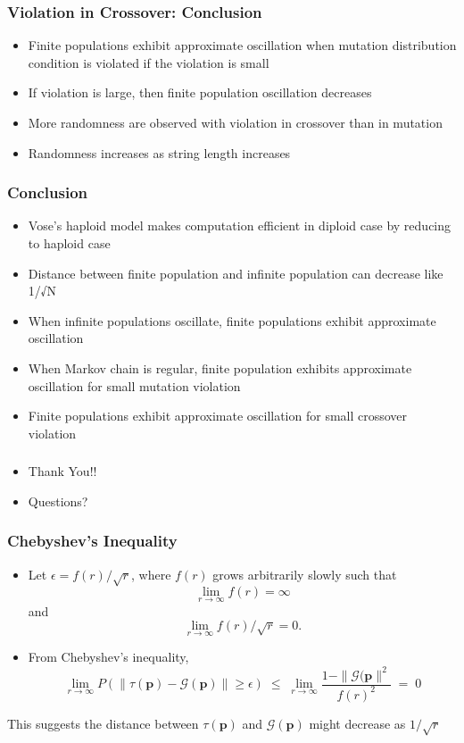 \documentclass[aspectratio=169]{beamer}
\begin{document}
  \begin{frame}
    \frametitle{Violation in Crossover: Conclusion}
    \begin{itemize}
      \item{Finite populations exhibit approximate oscillation when mutation distribution condition is violated if the violation is small} 
      \item{If violation is large, then finite population oscillation decreases}      
      \item{More randomness are observed with violation in crossover than in mutation}
      \item{Randomness increases as string length increases}
    \end{itemize}
  \end{frame}
  
  \begin{frame}
    \frametitle{Conclusion}
    \begin{itemize}
      \item{Vose's haploid model makes computation efficient in diploid case by reducing to haploid case} 
      \item{Distance between finite population and infinite population can decrease like 1/√N}
      \item{When infinite populations oscillate, finite populations exhibit approximate oscillation}
      \item{When Markov chain is regular, finite population exhibits approximate oscillation for small mutation violation}
      \item{Finite populations exhibit approximate oscillation for small crossover violation}      
    \end{itemize}
  \end{frame}
  
  \begin{frame}
    \frametitle{}
    \begin{itemize}
      \item{Thank You!!} 
      \item{Questions?}
    \end{itemize}
  \end{frame}
  
  \begin{frame}
    \frametitle{Chebyshev's Inequality}
    \begin{itemize}
      \item{Let $\epsilon = f(r)/\sqrt{r}$, where $f(r)$ grows arbitrarily slowly such that 
	\[
	\lim_{r \to \infty} f(r)  =  \infty
	\]
	and 
	\[
	\lim_{r \to \infty} f(r)/\sqrt{r}  =  0.
	\]
      }
      \item{From Chebyshev's inequality,
	\[
	  \lim_{r \to \infty} P(\| \tau (\bm{p}) - \mathcal{G}(\bm{p}) \| \geq \epsilon) \; \leq \; 
	  \lim_{r \to \infty}\frac{1 - \|\mathcal{G}(\bm{p}\|^2} {{f(r)}^2} \; = \; 0
	\]
      }      
    \end{itemize}
    This suggests the distance between $\tau(\bm{p})$ and $\mathcal{G}(\bm{p})$ might decrease as $1/\sqrt{r}$
  \end{frame}
  
\end{document}
